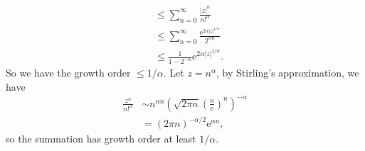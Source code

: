 \documentclass[11pt]{report}
\theoremstyle{mythm}
\let\oldendproof\endproof
\renewenvironment{proof}[1][\proofname]{%
  \oldproof[\normalfont \bfseries #1]%
}{\oldendproof}
\renewcommand*{\proofname}{Proof}
\theoremstyle{myans}
\newcommand{\me}{\mathrm{e}}
\begin{document}
\begin{enumerate}
\begin{proof}
\begin{align*}
      &\leq \sum_{n=0}^{\infty} \frac{|z|^n}{n!^\alpha}\\
      &\leq \sum_{n=0}^{\infty} \frac{\me^{2\alpha |z|^{1/\alpha}}}{2^{\alpha n}}\\
      &\leq \frac 1{1-2^{-\alpha}}\me^{2\alpha |z|^{1/\alpha}}.
    \end{align*}
    So we have the growth order $\leq 1/\alpha$.
    Let $z = n^\alpha$, by Stirling's approximation,
    we have
    \begin{align*}
      \frac{z^n}{n!^\alpha} &\sim n^{\alpha n} \left( \sqrt{2\pi n}\left(\frac{n}{\me}\right)^n \right)^{-\alpha}\\
      &= (2\pi n)^{-\alpha/2} \me^{\alpha n},
    \end{align*}
    so the summation has growth order at least $1/\alpha$.
  \end{proof}
\end{enumerate}
\end{document}
